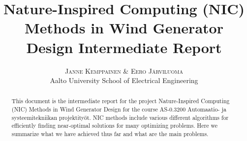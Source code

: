 \documentclass[twoside]{article}
\title{\vspace{-15mm}\fontsize{24pt}{10pt}\selectfont\textbf{Nature-Inspired Computing (NIC) Methods in Wind Generator Design Intermediate Report}} %
\author{
\large
\textsc{Janne Kemppainen \& Eero J\"arviluoma}\\[2mm] %
\normalsize Aalto University School of Electrical Engineering \\ %
\vspace{-5mm}
}
\date{}
\begin{document}
\maketitle %

\thispagestyle{fancy} %


\begin{abstract}

\noindent This document is the intermediate report for the project Nature-Inspired Computing (NIC) Methods in Wind Generator Design for the course AS-0.3200 Automaatio- ja systeemitekniikan projektity\"ot. NIC methods include various different algorithms for efficiently finding near-optimal solutions for many optimizing problems. Here we summarize what we have achieved thus far and what are the main problems.

\end{abstract}

\end{document}
